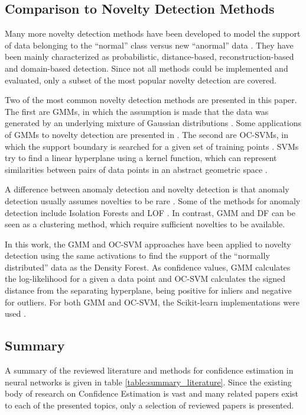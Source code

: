 \documentclass[10pt]{article}
\begin{document}
\subsection{Comparison to Novelty Detection Methods}
Many more novelty detection methods have been developed to model the support of data belonging to the ``normal'' class versus new ``anormal'' data \cite{Pimentel2014ARO, Markou2003NoveltyDApt1, Markou2003NoveltyDApt2}. They have been mainly characterized as probabilistic, distance-based, reconstruction-based and domain-based detection. Since not all methods could be implemented and evaluated, only a subset of the most popular novelty detection are covered. 

Two of the most common novelty detection methods are presented in this paper. The first are \glspl{GMM}, in which the assumption is made that the data was generated by an underlying mixture of Gaussian distributions \cite{Reynolds2009GaussianMM}. Some applications of \glspl{GMM} to novelty detection are presented in \cite{Pimentel2014ARO}. The second are \glspl{OC-SVM}, in which the support boundary is searched for a given set of training points \cite{Wang2004AnomalyID, Beghi2014AOS}. SVMs try to find a linear hyperplane using a kernel function, which can represent similarities between pairs of data points in an abstract geometric space \cite{Szymanski2011VisualisingKS}.

A difference between anomaly detection and novelty detection is that anomaly detection usually assumes novelties to be rare \cite{deMorsier2014thesis}. Some of the methods for anomaly detection include Isolation Forests and \gls{LOF} \cite{Pimentel2014ARO, Breunig2000LOFID, Liu2008IsolationF}. In contrast, \gls{GMM} and \gls{DF} can be seen as a clustering method, which require sufficient novelties to be available.

In this work, the \gls{GMM} and \gls{OC-SVM} approaches have been applied to novelty detection using the same activations to find the support of the ``normally distributed'' data as the Density Forest. As confidence values, \gls{GMM} calculates the log-likelihood for a given a data point and \gls{OC-SVM} calculates the signed distance from the separating hyperplane, being positive for inliers and negative for outliers. For both \gls{GMM} and \gls{OC-SVM}, the Scikit-learn implementations were used \cite{scikit-learn}.

\subsection{Summary}
A summary of the reviewed literature and methods for confidence estimation in neural networks is given in table \ref{table:summary_literature}. Since the existing body of research on Confidence Estimation is vast and many related papers exist to each of the presented topics, only a selection of reviewed papers is presented.
\end{document}
